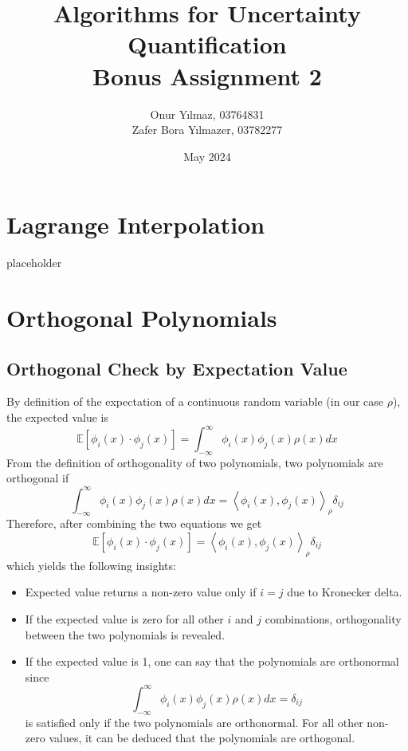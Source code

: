 \documentclass{article}
\title{Algorithms for Uncertainty Quantification\\
Bonus Assignment 2}
\author{Onur Yılmaz, 03764831 \\Zafer Bora Yılmazer, 03782277 }
\date{May 2024}
\begin{document}
\maketitle

\section{Lagrange Interpolation}
placeholder

\section{Orthogonal Polynomials}
\subsection{Orthogonal Check by Expectation Value}
By definition of the expectation of a continuous random variable (in our case $\rho$), the expected value is 
\begin{equation}
    \mathbb{E}[\phi_i(x)\cdot\phi_j(x)] = \int_{-\infty}^\infty\phi_i(x)\phi_j(x)\rho(x)dx
\end{equation}
From the definition of orthogonality of two polynomials, two polynomials are orthogonal if 
\begin{equation}
    \int_{-\infty}^\infty\phi_i(x)\phi_j(x)\rho(x)dx = \left\langle\phi_i(x), \phi_j(x)\right\rangle _\rho\delta_{ij}
\end{equation}
Therefore, after combining the two equations we get 
\begin{equation}
    \mathbb{E}[\phi_i(x)\cdot\phi_j(x)] = \left\langle\phi_i(x), \phi_j(x)\right\rangle _\rho\delta_{ij}
\end{equation}
which yields the following insights:
\begin{itemize}
    \item Expected value returns a non-zero value only if $i=j$ due to Kronecker delta.
    \item If the expected value is zero for all other $i$ and $j$ combinations, orthogonality between the two 
    polynomials is revealed.
    \item If the expected value is 1, one can say that the polynomials are orthonormal since 
    \[\int_{-\infty}^\infty\phi_i(x)\phi_j(x)\rho(x)dx = \delta_{ij}\] is satisfied only if the two polynomials are 
    orthonormal. For all other non-zero values, it can be deduced that the polynomials are orthogonal.
\end{itemize}
\end{document}
